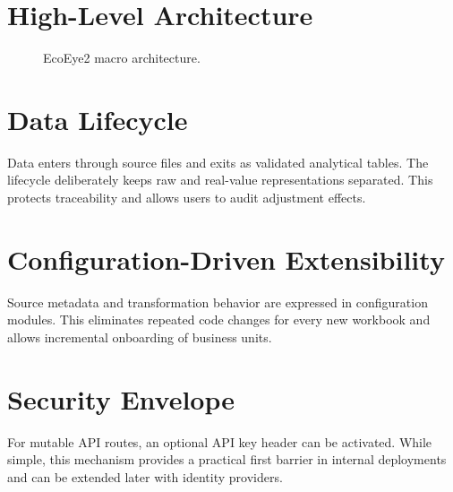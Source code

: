 \documentclass[12pt,a4paper]{report}
\begin{document}
\section{High-Level Architecture}
\begin{figure}[H]
\centering
{}
\caption{EcoEye2 macro architecture.}
\end{figure}

\section{Data Lifecycle}
Data enters through source files and exits as validated analytical tables. The lifecycle deliberately keeps raw and real-value representations separated. This protects traceability and allows users to audit adjustment effects.

\section{Configuration-Driven Extensibility}
Source metadata and transformation behavior are expressed in configuration modules. This eliminates repeated code changes for every new workbook and allows incremental onboarding of business units.

\section{Security Envelope}
For mutable API routes, an optional API key header can be activated. While simple, this mechanism provides a practical first barrier in internal deployments and can be extended later with identity providers.
\end{document}
